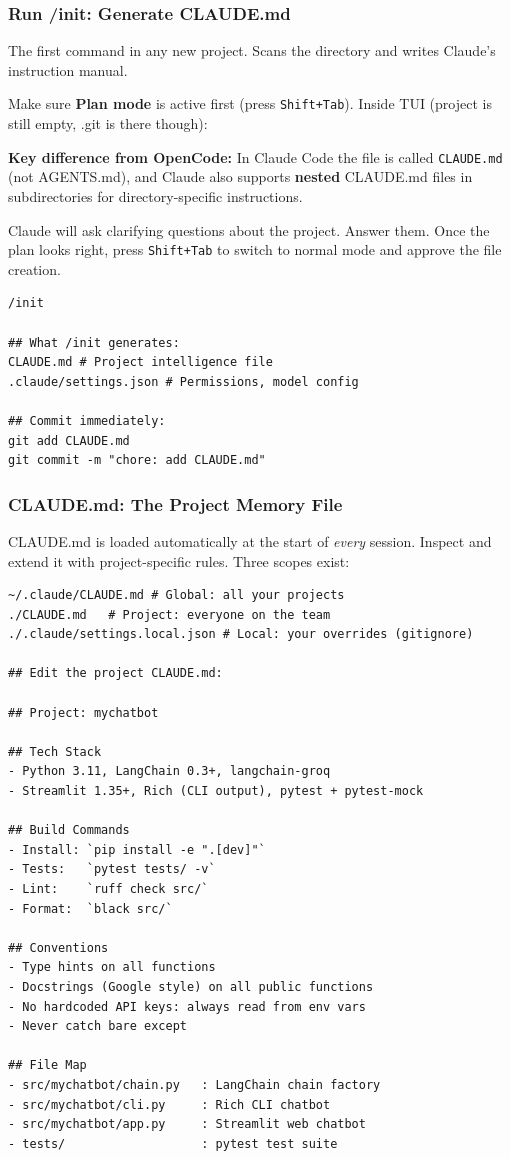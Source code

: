 \begin{frame}[fragile]\frametitle{Run /init: Generate CLAUDE.md}
The first command in any new project. Scans the directory and writes Claude's instruction manual.

Make sure \textbf{Plan mode} is active first (press \texttt{Shift+Tab}). Inside TUI (project is still empty, .git is there though):

\textbf{Key difference from OpenCode:} In Claude Code the file is called \texttt{CLAUDE.md} (not AGENTS.md), and Claude also supports \textbf{nested} CLAUDE.md files in subdirectories for directory-specific instructions.

Claude will ask clarifying questions about the project. Answer them. Once the plan looks right, press \texttt{Shift+Tab} to switch to normal mode and approve the file creation.


\begin{lstlisting}
/init

## What /init generates:
CLAUDE.md # Project intelligence file
.claude/settings.json # Permissions, model config

## Commit immediately:
git add CLAUDE.md
git commit -m "chore: add CLAUDE.md"
\end{lstlisting}
\end{frame}


\begin{frame}[fragile]\frametitle{CLAUDE.md: The Project Memory File}
CLAUDE.md is loaded automatically at the start of \textit{every} session. Inspect and extend it with project-specific rules. Three scopes exist:

\begin{lstlisting}
~/.claude/CLAUDE.md # Global: all your projects
./CLAUDE.md   # Project: everyone on the team
./.claude/settings.local.json # Local: your overrides (gitignore)

## Edit the project CLAUDE.md:

## Project: mychatbot

## Tech Stack
- Python 3.11, LangChain 0.3+, langchain-groq
- Streamlit 1.35+, Rich (CLI output), pytest + pytest-mock

## Build Commands
- Install: `pip install -e ".[dev]"`
- Tests:   `pytest tests/ -v`
- Lint:    `ruff check src/`
- Format:  `black src/`

## Conventions
- Type hints on all functions
- Docstrings (Google style) on all public functions
- No hardcoded API keys: always read from env vars
- Never catch bare except

## File Map
- src/mychatbot/chain.py   : LangChain chain factory
- src/mychatbot/cli.py     : Rich CLI chatbot
- src/mychatbot/app.py     : Streamlit web chatbot
- tests/                   : pytest test suite
\end{lstlisting}
\end{frame}



